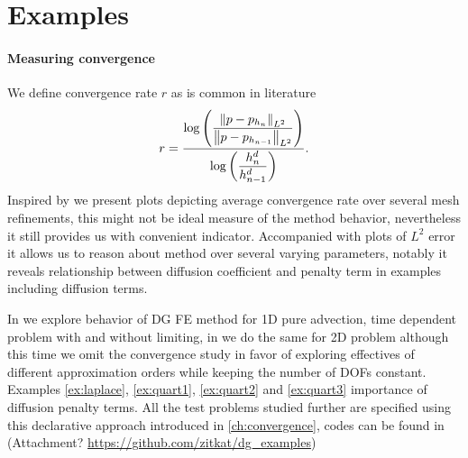 \section{Examples}

\paragraph{Measuring convergence} We define convergence rate $r$ as is common 
in literature
\begin{equation}
r = \frac{\log\left(\dfrac{\left\lVert p - p_{h_{n}}\right\rVert_{L^2}}{\left\lVert p - p_{h_{n-1}}\right\rVert_{L^2}}\right)}
{\log\left(\dfrac{h^d_{n}}{h^d_{n-1}}\right)}.
\end{equation}
Inspired by \cite{Kucera} we present plots depicting average convergence rate 
over several mesh refinements, this might not be ideal measure of the method 
behavior, nevertheless it still provides us with convenient indicator. 
Accompanied with plots of $L^2$ error it allows us to reason about method over 
several varying parameters, notably it reveals relationship between diffusion 
coefficient and penalty term in examples including diffusion terms.

In  we explore behavior of DG FE method for 1D pure advection, 
time dependent problem with and without limiting, in  we do the same 
for 2D problem although this time we omit the convergence study in favor of exploring 
effectives of different approximation orders while keeping the number of DOFs constant. 
Examples \ref{ex:laplace}, \ref{ex:quart1}, \ref{ex:quart2} and \ref{ex:quart3} 
importance of diffusion penalty terms. All the test problems studied further
are specified using this declarative approach introduced in \ref{ch:convergence}, 
codes can be found in (\todo Attachment? \url{https://github.com/zitkat/dg_examples})
